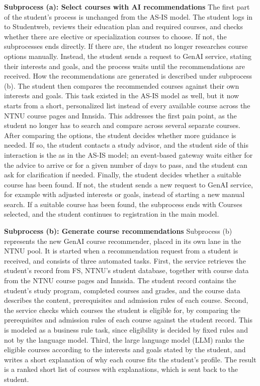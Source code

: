 \textbf{Subprocess (a): Select courses with AI recommendations}
The first part of the student's process is unchanged from the AS-IS model. The student logs in to Studentweb, reviews their education plan and required courses, and checks whether there are elective or specialization courses to choose. If not, the subprocesses ends directly. If there are, the student no longer researches course options manually. Instead, the student sends a request to GenAI service, stating their interests and goals, and the process waits until the recommendations are received. How the recommendations are generated is described under subprocess (b). The student then compares the recommended courses against their own interests and goals. This task existed in the AS-IS model as well, but it now starts from a short, personalized list instead of every available course across the NTNU course pages and Innsida. This addresses the first pain point, as the student no longer has to search and compare across several separate courses. After comparing the options, the student decides whether more guidance is needed. If so, the student contacts a study advisor, and the student side of this interaction is the as in the AS-IS model; an event-based gateway waits either for the advice to arrive or for a given number of days to pass, and the student can ask for clarification if needed. Finally, the student decides whether a suitable course has been found. If not, the student sends a new request to GenAI service, for example with adjusted interests or goals, instead of starting a new manual search. If a suitable course has been found, the subprocess ends with Courses selected, and the student continues to registration in the main model.

\textbf{Subprocess (b): Generate course recommendations}
Subprocess (b) represents the new GenAI course recommender, placed in its own lane in the NTNU pool. It is started when a recommendation request from a student is received, and consists of three automated tasks. First, the service retrieves the student's record from FS, NTNU's student database, together with course data from the NTNU course pages and Innsida. The student record contains the student's study program, completed courses and grades, and the course data describes the content, prerequisites and admission rules of each course. Second, the service checks which courses the student is eligible for, by comparing the prerequisites and admission rules of each course against the student record. This is modeled as a business rule task, since eligibility is decided by fixed rules and not by the language model. Third, the large language model (LLM) ranks the eligible courses according to the interests and goals stated by the student, and writes a short explanation of why each course fits the student's profile. The result is a ranked short list of courses with explanations, which is sent back to the student. 

